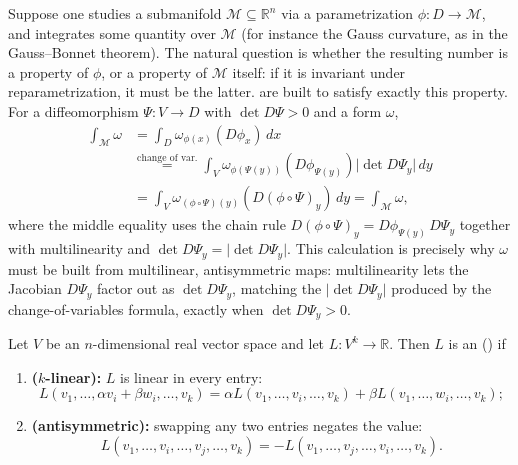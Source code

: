 \begin{ainote}[Motivation]
Suppose one studies a submanifold $\mathcal{M} \subseteq \mathbb{R}^n$ via a parametrization
$\phi : D \to \mathcal{M}$, and integrates some quantity over $\mathcal{M}$ (for instance the
Gauss curvature, as in the Gauss--Bonnet theorem). The natural question is whether the
resulting number is a property of $\phi$, or a property of $\mathcal{M}$ itself: if it is
invariant under reparametrization, it must be the latter.  are
built to satisfy exactly this property. For a diffeomorphism $\Psi : V \to D$ with
$\det D\Psi > 0$ and a form $\omega$,
\begin{align}
\int_{\mathcal{M}} \omega &= \int_D \omega_{\phi(x)}(D\phi_x)\,dx \nonumber \\
  &\overset{\text{change of var.}}{=} \int_V \omega_{\phi(\Psi(y))}(D\phi_{\Psi(y)})
  \lvert\det D\Psi_y\rvert\,dy \nonumber \\
  &= \int_V \omega_{(\phi\circ\Psi)(y)}(D(\phi\circ\Psi)_y)\,dy = \int_{\mathcal{M}} \omega,
  \nonumber
\end{align}
where the middle equality uses the chain rule $D(\phi\circ\Psi)_y = D\phi_{\Psi(y)}\,D\Psi_y$
together with multilinearity and $\det D\Psi_y = \lvert\det D\Psi_y\rvert$. This calculation
is precisely why $\omega$ must be built from multilinear, antisymmetric maps: multilinearity
lets the Jacobian $D\Psi_y$ factor out as $\det D\Psi_y$, matching the $\lvert\det
D\Psi_y\rvert$ produced by the change-of-variables formula, exactly when $\det D\Psi_y > 0$.
\end{ainote}

\begin{definition}
\label{def:antisymmetric_k_linear_form}
Let $V$ be an $n$-dimensional real vector space and let $L : V^k \to \mathbb{R}$. Then $L$ is
an  ()
if
\begin{enumerate}[label=\textbf{(\alph*)}]
  \item \textbf{($k$-linear):} $L$ is linear in every entry:
  \[L(v_1,\ldots,\alpha v_i+\beta w_i,\ldots,v_k) = \alpha L(v_1,\ldots,v_i,\ldots,v_k)
    + \beta L(v_1,\ldots,w_i,\ldots,v_k);\]
  \item \textbf{(antisymmetric):} swapping any two entries negates the value:
  \[L(v_1,\ldots,v_i,\ldots,v_j,\ldots,v_k) = -L(v_1,\ldots,v_j,\ldots,v_i,\ldots,v_k).\]
\end{enumerate}
\end{definition}

